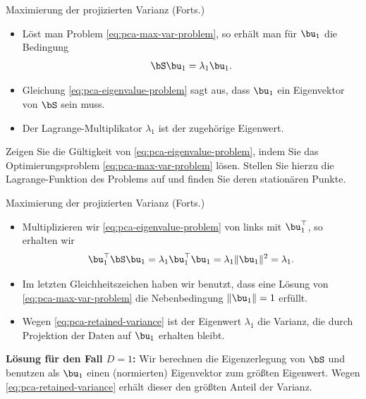 \begin{frame}{Maximierung der projizierten Varianz (Forts.)}{}
	\begin{itemize}
		\item Löst man Problem \eqref{eq:pca-max-var-problem}, so erhält man für $\bu_1$ die Bedingung
		\begin{equation} \label{eq:pca-eigenvalue-problem}
			\bS \bu_1 = \lambda_1 \bu_1.
		\end{equation}
		\item Gleichung \eqref{eq:pca-eigenvalue-problem} sagt aus, dass $\bu_1$ ein Eigenvektor von $\bS$ sein muss.
		\item Der Lagrange-Multiplikator $\lambda_1$ ist der zugehörige Eigenwert.
	\end{itemize}

	\begin{mytask}
		Zeigen Sie die Gültigkeit von \eqref{eq:pca-eigenvalue-problem}, indem Sie das
		Optimierungsproblem \eqref{eq:pca-max-var-problem} lösen. Stellen Sie hierzu die Lagrange-Funktion des Problems auf
		und finden Sie deren stationären Punkte.
	\end{mytask}
\end{frame}


\begin{frame}{Maximierung der projizierten Varianz (Forts.)}{}
	\begin{itemize}
		\item Multiplizieren wir \eqref{eq:pca-eigenvalue-problem} von links mit $\bu_1^\top$, so erhalten wir
		\begin{equation} \label{eq:pca-retained-variance}
			\bu_1^\top \bS \bu_1 = \lambda_1 \bu_1^\top \bu_1 = \lambda_1 \Vert \bu_1 \Vert^2 = \lambda_1.
		\end{equation}
		\item Im letzten Gleichheitszeichen haben wir benutzt, dass eine Lösung von \eqref{eq:pca-max-var-problem}
			die Nebenbedingung $\Vert \bu_1 \Vert = 1$ erfüllt.
		\item Wegen \eqref{eq:pca-retained-variance} ist der Eigenwert $\lambda_1$ die Varianz, die durch Projektion der Daten
			auf $\bu_1$ erhalten bleibt.
	\end{itemize}

	\begin{boxGray}
		\textbf{Lösung für den Fall $D = 1$:} Wir berechnen die Eigenzerlegung von $\bS$ und benutzen als $\bu_1$
		einen (normierten) Eigenvektor zum größten Eigenwert. Wegen \eqref{eq:pca-retained-variance} erhält dieser den
		größten Anteil der Varianz.
	\end{boxGray}
\end{frame}


